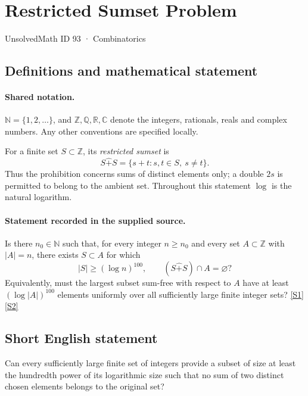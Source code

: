 \documentclass[11pt]{article}
\newcommand{\sref}[2]{\hyperlink{source:#1:#2}{[S#2]}}
\begin{document}
\setcounter{section}{92}
\section{Restricted Sumset Problem}\label{93}
{\small\sffamily UnsolvedMath ID 93 · Combinatorics}
\subsection{Definitions and mathematical statement}

\paragraph{Shared notation.}$\mathbb N=\{1,2,\ldots\}$, and $\mathbb Z,\mathbb Q,\mathbb R,\mathbb C$ denote the integers, rationals, reals and complex numbers. Any other conventions are specified locally.


For a finite set $S\subset\mathbb Z$, its \emph{restricted sumset} is
\[
S\widehat{+}S=\{s+t:s,t\in S,\ s\ne t\}.
\]
Thus the prohibition concerns sums of distinct elements only; a double $2s$ is permitted to belong to the ambient set. Throughout this statement $\log$ is the natural logarithm.
\paragraph{Statement recorded in the supplied source.}
Is there $n_0\in\mathbb N$ such that, for every integer $n\ge n_0$ and every set $A\subset\mathbb Z$ with $|A|=n$, there exists $S\subset A$ for which
\[
|S|\ge(\log n)^{100},\qquad (S\widehat{+}S)\cap A=\varnothing?
\]
Equivalently, must the largest subset sum-free with respect to $A$ have at least $(\log |A|)^{100}$ elements uniformly over all sufficiently large finite integer sets? \sref{93}{1}\sref{93}{2}
\subsection{Short English statement}
Can every sufficiently large finite set of integers provide a subset of size at least the hundredth power of its logarithmic size such that no sum of two distinct chosen elements belongs to the original set?
\end{document}
